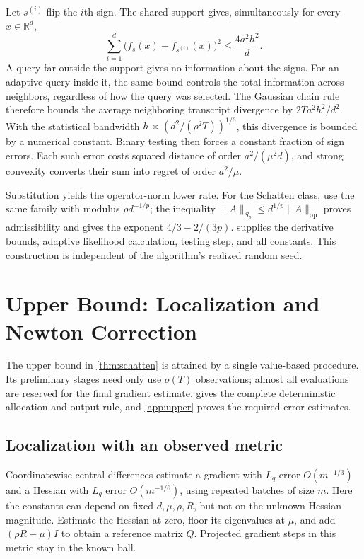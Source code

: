 \documentclass[11pt,a4paper]{article}
\newcommand{\R}{\mathbb R}
\newcommand{\op}{\mathrm{op}}
\theoremstyle{definition}
\theoremstyle{remark}
\begin{document}
Let $s^{(i)}$ flip the $i$th sign. The shared support gives, simultaneously for every $x\in\R^d$,
\[
 \sum_{i=1}^d\big(f_s(x)-f_{s^{(i)}}(x)\big)^2
 \le \frac{4a^2h^2}{d}.
\]
A query far outside the support gives no information about the signs. For an adaptive query inside it, the same bound controls the total information across neighbors, regardless of how the query was selected. The Gaussian chain rule therefore bounds the average neighboring transcript divergence by $2Ta^2h^2/d^2$. With the statistical bandwidth $h\asymp(d^2/(\rho^2T))^{1/6}$, this divergence is bounded by a numerical constant. Binary testing then forces a constant fraction of sign errors. Each such error costs squared distance of order $a^2/(\mu^2d)$, and strong convexity converts their sum into regret of order $a^2/\mu$.

Substitution yields the operator-norm lower rate. For the Schatten class, use the same family with modulus $\rho d^{-1/p}$; the inequality $\|A\|_{S_p}\le d^{1/p}\|A\|_{\op}$ proves admissibility and gives the exponent $4/3-2/(3p)$.  supplies the derivative bounds, adaptive likelihood calculation, testing step, and all constants. This construction is independent of the algorithm's realized random seed.

\section{Upper Bound: Localization and Newton Correction}
\label{sec:upper-overview}
The upper bound in \cref{thm:schatten} is attained by a single value-based procedure. Its preliminary stages need only use $o(T)$ observations; almost all evaluations are reserved for the final gradient estimate.  gives the complete deterministic allocation and output rule, and \cref{app:upper} proves the required error estimates.

\subsection{Localization with an observed metric}
Coordinatewise central differences estimate a gradient with $L_q$ error $O(m^{-1/3})$ and a Hessian with $L_q$ error $O(m^{-1/6})$, using repeated batches of size $m$. Here the constants can depend on fixed $d,\mu,\rho,R$, but not on the unknown Hessian magnitude. Estimate the Hessian at zero, floor its eigenvalues at $\mu$, and add $(\rho R+\mu)I$ to obtain a reference matrix $Q$. Projected gradient steps in this metric stay in the known ball.
\end{document}
